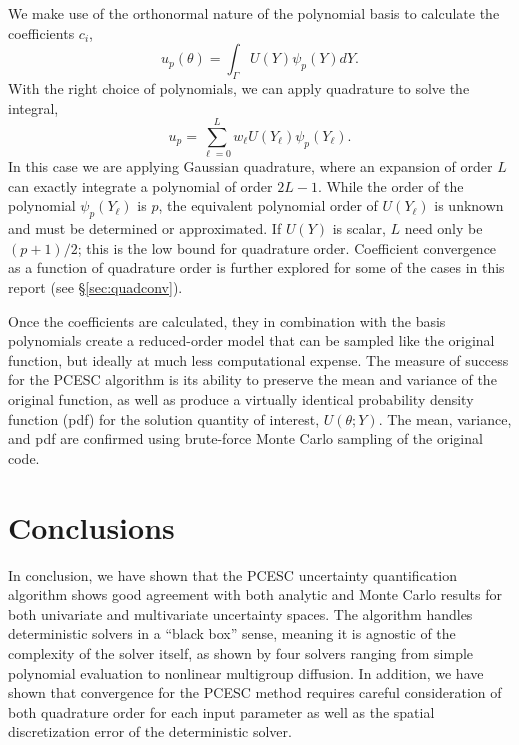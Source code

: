 \documentclass[11pt]{article} %
\begin{document}
We make use of the orthonormal nature of the polynomial basis to calculate the coefficients $c_i$,
\begin{equation}
u_p(\theta) = \int_\Gamma U(Y)\psi_p(Y)dY.
\end{equation}
With the right choice of polynomials, we can apply quadrature to solve the integral,
\begin{equation}
u_p = \sum_{\ell=0}^{L} w_\ell U(Y_\ell) \psi_p(Y_\ell).
\end{equation}
In this case we are applying Gaussian quadrature, where an expansion of order $L$ can exactly integrate a polynomial of order $2L-1$.  While the order of the polynomial $\psi_p(Y_\ell)$ is $p$, the equivalent polynomial order of $U(Y_\ell)$ is unknown and must be determined or approximated.  If $U(Y)$ is scalar, $L$ need only be $(p+1)/2$; this is the low bound for quadrature order.  Coefficient convergence as a function of quadrature order is further explored for some of the cases in this report (see \S \ref{sec:quadconv}).

Once the coefficients are calculated, they in combination with the basis polynomials create a reduced-order model that can be sampled like the original function, but ideally at much less computational expense.  The measure of success for the PCESC algorithm is its ability to preserve the mean and variance of the original function, as well as produce a virtually identical probability density function (pdf) for the solution quantity of interest, $U(\theta;Y)$.  The mean, variance, and pdf are confirmed using brute-force Monte Carlo sampling of the original code.







%
%
%
%
\section{Conclusions}
In conclusion, we have shown that the PCESC uncertainty quantification algorithm shows good agreement with both analytic and Monte Carlo results for both univariate and multivariate uncertainty spaces.  The algorithm handles deterministic solvers in a ``black box'' sense, meaning it is agnostic of the complexity of the solver itself, as shown by four solvers ranging from simple polynomial evaluation to nonlinear multigroup diffusion.  In addition, we have shown that convergence for the PCESC method requires careful consideration of both quadrature order for each input parameter as well as the spatial discretization error of the deterministic solver.
\end{document}
